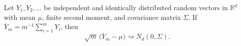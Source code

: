 Let \(Y_1,Y_2,\ldots\) be independent and identically distributed random vectors in \(\mathbb R^d\) with mean \(\mu\), finite second moment, and covariance matrix \(\Sigma\). If \(\overline Y_m=m^{-1}\sum_{i=1}^mY_i\), then
\[
 \sqrt m\,\bigl(\overline Y_m-\mu\bigr)\rightsquigarrow N_d(0,\Sigma).
\]